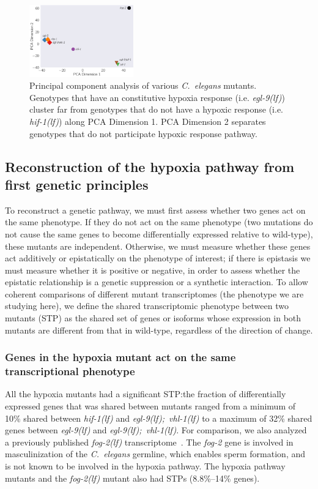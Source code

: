 \documentclass[9pt,twocolumn,twoside]{pnas-new}
\newcommand{\cel}{\emph{C.~elegans}}
\newcommand{\gene}[1]{\mbox{\emph{#1}}}
\newcommand{\fog}{\gene{fog-2(lf)}}
\newcommand{\egl}{\gene{egl-9(lf)}}
\newcommand{\eglvhl}{\gene{egl-9(lf); vhl-1(lf)}}
\newcommand{\hif}{\gene{hif-1(lf)}}
\begin{document}
\begin{figure}[tbhp]
  \centering
  \includegraphics[width=0.4\textwidth]{../figs/pca.pdf}
  \caption{
    Principal component analysis of various \cel{} mutants. Genotypes that have
    an constitutive hypoxia response (i.e. \egl{}) cluster far from genotypes
    that do not have a hypoxic response (i.e. \hif{}) along PCA Dimension 1. PCA
    Dimension 2 separates genotypes that do not participate hypoxic response
    pathway.
  }
\label{fig:pca}
\end{figure}

\subsection*{Reconstruction of the hypoxia pathway from first genetic principles}
\label{sec:reconstruct}
To reconstruct a genetic pathway, we must first assess whether two genes act on
the same phenotype. If they do not act on the same phenotype (two mutations do
not cause the same genes to become differentially expressed relative to
wild-type), these mutants are independent. Otherwise, we must measure whether
these genes act additively or epistatically on the phenotype of interest; if
there is epistasis we must measure whether it is positive or negative, in order
to assess whether the epistatic relationship is a genetic suppression or a
synthetic interaction. To allow coherent comparisons of different mutant
transcriptomes (the phenotype we are studying here), we define the shared
transcriptomic phenotype between two mutants (STP) as the shared set of genes or
isoforms whose expression in both mutants are different from that in wild-type,
regardless of the direction of change.

\subsubsection*{Genes in the hypoxia mutant act on the same transcriptional
                phenotype}
\label{sec:phenotypes}
All the hypoxia mutants had a significant STP:\@ the fraction of differentially
expressed genes that was shared between mutants ranged from a minimum of 10\%
shared between \hif{} and \eglvhl{} to a maximum of 32\% shared genes between
\egl{} and \eglvhl{}. For comparison, we also analyzed a previously published
\fog{} transcriptome~\cite{Angeles-Albores2016a}. The \gene{fog-2} gene is
involved in masculinization of the \cel{} germline, which enables sperm
formation, and is not known to be involved in the hypoxia pathway. The hypoxia
pathway mutants and the \fog{} mutant also had STPs (8.8\%--14\% genes).
\end{document}
